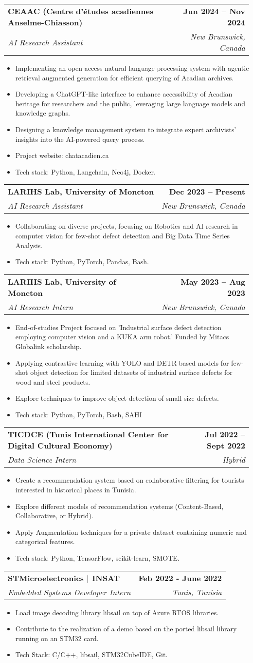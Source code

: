 \documentclass[letterpaper,11pt]{article}
\makeatletter
\newcommand{\resumeItem}[1]{
  \item\small{
    {#1 \vspace{-2pt}}
  }
}
\newcommand{\resumeSubheading}[4]{
  \vspace{-2pt}\item
    \begin{tabular*}{1.0\textwidth}[t]{l@{\extracolsep{\fill}}r}
      \textbf{#1} & \textbf{\small #2} \\
      \textit{\small#3} & \textit{\small #4} \\
    \end{tabular*}\vspace{-7pt}
}
\newcommand{\resumeItemListStart}{\begin{itemize}}
\newcommand{\resumeItemListEnd}{\end{itemize}\vspace{-4pt}}
\makeatother
\begin{document}
\resumeSubheading
{CEAAC (Centre d'études acadiennes Anselme-Chiasson)}{Jun 2024 -- Nov 2024}
{AI Research Assistant}{New Brunswick, Canada}
\resumeItemListStart
\resumeItem{Implementing an open-access natural language processing system with agentic retrieval augmented generation for efficient querying of Acadian archives.}
\resumeItem{Developing a ChatGPT-like interface to enhance accessibility of Acadian heritage for researchers and the public, leveraging large language models and knowledge graphs.}
\resumeItem{Designing a knowledge management system to integrate expert archivists' insights into the AI-powered query process.}
\resumeItem{Project website: chatacadien.ca}
\resumeItem{Tech stack: Python, Langchain, Neo4j, Docker.}
\resumeItemListEnd
\resumeSubheading
{LARIHS Lab, University of Moncton}{Dec 2023 -- Present}
{AI Research Assistant}{New Brunswick, Canada}
\resumeItemListStart
\resumeItem{Collaborating on diverse projects, focusing on Robotics and AI research in computer vision for few-shot defect detection and Big Data Time Series Analysis.}
\resumeItem{Tech stack: Python, PyTorch, Pandas, Bash.}
\resumeItemListEnd


\resumeSubheading
{LARIHS Lab, University of Moncton}{May 2023 -- Aug 2023}
{AI Research Intern}{New Brunswick, Canada}
\resumeItemListStart
\resumeItem{End-of-studies Project focused on 'Industrial surface defect detection employing computer vision and a KUKA arm robot.' Funded by Mitacs Globalink scholarship.}
\resumeItem{Applying contrastive learning with YOLO and DETR based models for few-shot object detection for limited datasets of industrial surface defects for wood and steel products.}
\resumeItem{Explore techniques to improve object detection of small-size defects.}
\resumeItem{Tech stack: Python, PyTorch, Bash, SAHI}
\resumeItemListEnd

\resumeSubheading
{TICDCE (Tunis International Center for Digital Cultural Economy)}{Jul 2022 -- Sept 2022}
{Data Science Intern}{Hybrid}
\resumeItemListStart
\resumeItem{Create a recommendation system based on collaborative filtering for tourists interested in historical places in Tunisia.}
\resumeItem{Explore different models of recommendation systems (Content-Based, Collaborative, or Hybrid).}
\resumeItem{Apply Augmentation techniques for a private dataset containing numeric and categorical features.}
\resumeItem{Tech stack: Python, TensorFlow, scikit-learn, SMOTE.}
\resumeItemListEnd

\resumeSubheading
{STMicroelectronics | INSAT}{Feb 2022 - June 2022}
{Embedded Systems Developer Intern}{Tunis, Tunisia}
\resumeItemListStart
\resumeItem{Load image decoding library libsail on top of Azure RTOS libraries.}
\resumeItem{Contribute to the realization of a demo based on the ported libsail library running on an STM32 card.}
\resumeItem{Tech Stack: C/C++, libsail, STM32CubeIDE, Git.}
\resumeItemListEnd
\end{document}
